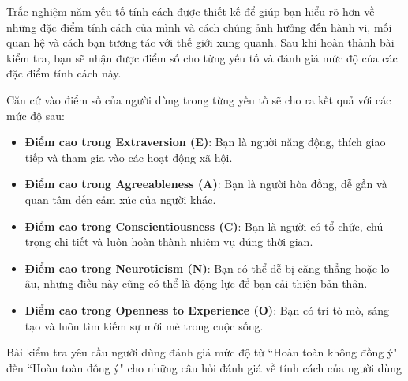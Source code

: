 Trắc nghiệm năm yếu tố tính cách được thiết kế để giúp bạn hiểu rõ hơn về những đặc điểm tính cách của mình và cách chúng ảnh hưởng đến hành vi, mối quan hệ và cách bạn tương tác với thế giới xung quanh. Sau khi hoàn thành bài kiểm tra, bạn sẽ nhận được điểm số cho từng yếu tố và đánh giá mức độ của các đặc điểm tính cách này.

Căn cứ vào điểm số của người dùng trong từng yếu tố sẽ cho ra kết quả với các mức độ sau:
\begin{itemize}
    \item \textbf{Điểm cao trong Extraversion (E)}: Bạn là người năng động, thích giao tiếp và tham gia vào các hoạt động xã hội.
    \item \textbf{Điểm cao trong Agreeableness (A)}: Bạn là người hòa đồng, dễ gần và quan tâm đến cảm xúc của người khác.
    \item \textbf{Điểm cao trong Conscientiousness (C)}: Bạn là người có tổ chức, chú trọng chi tiết và luôn hoàn thành nhiệm vụ đúng thời gian.
    \item \textbf{Điểm cao trong Neuroticism (N)}: Bạn có thể dễ bị căng thẳng hoặc lo âu, nhưng điều này cũng có thể là động lực để bạn cải thiện bản thân.
    \item \textbf{Điểm cao trong Openness to Experience (O)}: Bạn có trí tò mò, sáng tạo và luôn tìm kiếm sự mới mẻ trong cuộc sống.
\end{itemize}

Bài kiểm tra yêu cầu người dùng đánh giá mức độ từ ``Hoàn toàn không đồng ý" đến ``Hoàn toàn đồng ý" cho những câu hỏi đánh giá về tính cách của người dùng

